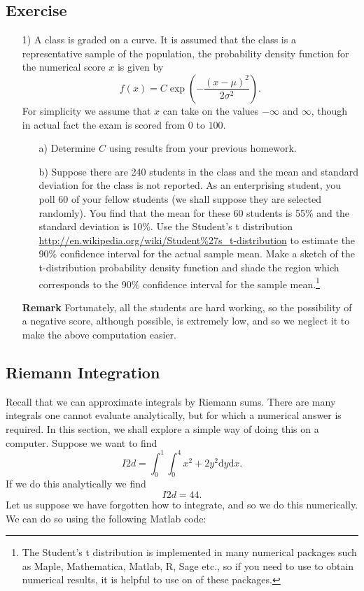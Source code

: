 \subsection{Exercise}
\begin{itemize}
\item[1)] A class is graded on a curve. It is assumed that the class is a representative sample of the population, the probability density function for the numerical score $x$ is given by
$$ f(x)=C\exp\left(-\frac{(x-\mu)^2}{2\sigma^2}\right).$$
For simplicity we assume that $x$ can take on the values $-\infty$ and $\infty$, though in actual fact the exam is scored from $0$ to $100$. 
\begin{enumerate}
\item[a)] Determine $C$ using results from your previous homework.
\item[b)] Suppose there are 240 students in the class and the mean and standard deviation for the class is not reported. As an enterprising student, you poll 60 of your fellow students (we shall suppose they are selected randomly).  You find that the mean for these 60 students is 55\% and the standard deviation is 10\%. Use the Student's t distribution \url{http://en.wikipedia.org/wiki/Student\%27s_t-distribution} to estimate the 90\% confidence interval for the actual sample mean. Make a sketch of the t-distribution probability density function and shade the region which corresponds to the 90\% confidence interval for the sample mean.\footnote{The Student's t distribution is implemented in many numerical packages such as Maple, Mathematica, Matlab, R, Sage etc., so if you need to use to obtain numerical results, it is helpful to use on of these packages.} 
\end{enumerate}

{\bf Remark} Fortunately, all the students are hard working, so the possibility of a negative score, although possible, is extremely low, and so we neglect it to make the above computation easier.
\end{itemize}

\subsection{Riemann Integration}

Recall that we can approximate integrals by Riemann sums. There are many integrals one cannot evaluate analytically, but for which a numerical answer is required. In this section, we shall explore a simple way of doing this on a computer. Suppose we want to find 
$$I2d=\int_0^1\int_0^4 x^2+2y^2\mathrm{d}y\mathrm{d}x.$$
If we do this analytically we find
$$I2d=44.$$
Let us suppose we have forgotten how to integrate, and so we do this numerically. We can do so using the following Matlab code:


